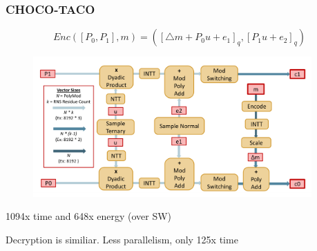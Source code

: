 \documentclass[10pt,handout]{beamer}
\begin{document}
\begin{frame}
\frametitle{CHOCO-TACO}
    \vspace{-0.5cm}
\begin{equation*}
    Enc([P_0,P_1],m) = ([\triangle m + P_0u+e_1]_q, [P_1u+e_2]_q)
\end{equation*}
\pause
    \vspace{-1.cm}
\begin{figure}
    \includegraphics[width=0.95\textwidth]{pipeline.png}
\end{figure}
    \vspace{-0.5cm}
\pause
\centering
    1094x time and 648x energy (over SW)
\pause

    \vspace{-0.2cm}
Decryption is similiar. Less parallelism, only 125x time




\end{frame}
\end{document}
